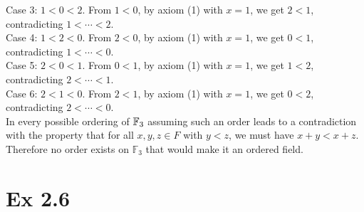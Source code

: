 \documentclass{report}
\begin{document}
\begin{proofWithHibiscus}
  Case 3: $1<0<2$.  
  From $1<0$, by axiom (1) with $x=1$, we get $2<1$, contradicting $1<\cdots<2$.  \\
  
  Case 4: $1<2<0$.  
  From $2<0$, by axiom (1) with $x=1$, we get $0<1$, contradicting $1<\cdots<0$.  \\
  
  Case 5: $2<0<1$.  
  From $0<1$, by axiom (1) with $x=1$, we get $1<2$, contradicting $2<\cdots<1$.  \\
  
  Case 6: $2<1<0$.  
  From $2<1$, by axiom (1) with $x=1$, we get $0<2$, contradicting $2<\cdots<0$.  \\
  
  In every possible ordering of $\mathbb{F}_{3}$ assuming such an order leads to a contradiction with
  the property that for all $x,y,z \in F$ with $y<z$, we must have $x+y<x+z$. Therefore no order exists on $\mathbb{F}_3$ that would make it an ordered field.

\end{proofWithHibiscus}


\section*{Ex 2.6}

\end{document}
